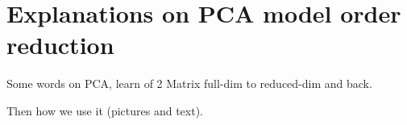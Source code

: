 \section{Explanations on PCA model order reduction}

Some words on PCA, learn of 2 Matrix full-dim to reduced-dim and back.


Then how we use it (pictures and text).